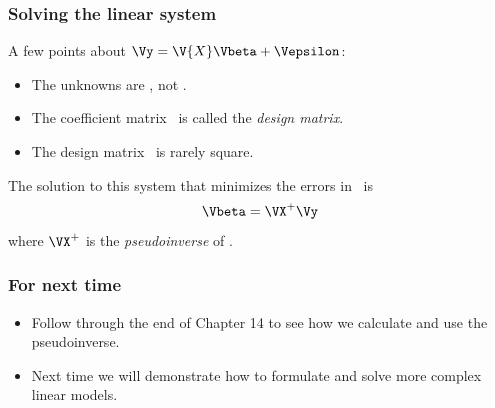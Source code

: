 \documentclass{beamer}
\begin{document}
\begin{frame}
\frametitle{Solving the linear system}

A few points about $\Vy = \V{X}\Vbeta+\Vepsilon$:
\begin{itemize}
	\item The unknowns are \Vbeta, not .
	\item The coefficient matrix \ is called the \emph{design matrix}.
	\item The design matrix \ is rarely square.
\end{itemize}

\pause
The solution to this system that minimizes the errors in \Vepsilon\ is 
\[ \Vbeta = \VX^+\Vy \]
where $\VX^+$ is the \emph{pseudoinverse} of \VX.
\end{frame}

\begin{frame}
\frametitle{For next time}
\begin{itemize}
	\item Follow through the end of Chapter 14 to see how we calculate and use the pseudoinverse.
	\item Next time we will demonstrate how to formulate and solve more complex linear models.
\end{itemize}	
\end{frame}
\end{document}
